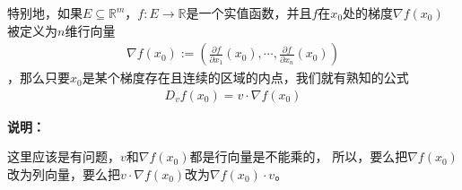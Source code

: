 \documentclass{article}
\begin{document}
\begin{zremark}
  特别地，如果$E \subseteq \mathbb{R}^m$，$f: E \to \mathbb{R}$是一个实值函数，并且$f$在$x_0$处的梯度$\nabla f(x_0)$
  被定义为$n$维行向量
  \begin{align*}
    \nabla f(x_0) := \left(\frac{\partial f}{\partial x_1}(x_0),\cdots,\frac{\partial f}{\partial x_n}(x_0)\right)
  \end{align*}
  ，那么只要$x_0$是某个梯度存在且连续的区域的内点，我们就有熟知的公式
  \begin{align*}
    D_vf(x_0) = v \cdot \nabla f(x_0)
  \end{align*}
\end{zremark}

\textbf{说明：}

这里应该是有问题，$v$和$\nabla f(x_0)$都是行向量是不能乘的，
所以，要么把$\nabla f(x_0)$改为列向量，要么把$v \cdot \nabla f(x_0)$改为$\nabla f(x_0) \cdot v$。
\end{document}
